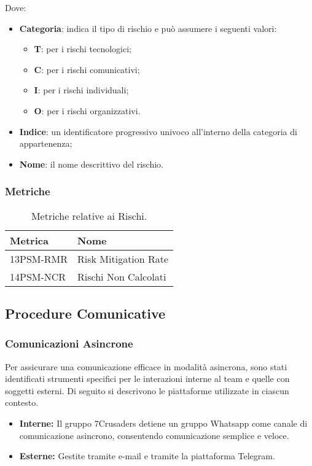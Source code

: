 Dove:
\begin{itemize}
    \item \textbf{Categoria}: indica il tipo di rischio e può assumere i seguenti valori:
    \begin{itemize}
        \item \textbf{T}: per i rischi tecnologici;
        \item \textbf{C}: per i rischi comunicativi;
        \item \textbf{I}: per i rischi individuali;
        \item \textbf{O}: per i rischi organizzativi.
    \end{itemize}
    \item \textbf{Indice}: un identificatore progressivo univoco all'interno della categoria di appartenenza;
    \item \textbf{Nome}: il nome descrittivo del rischio.
\end{itemize}

\subsubsection{Metriche}
\begin{table}[h!]
    \centering
    \renewcommand{\arraystretch}{1.5}
    \begin{tabular}{|l|l|}
        \hline
        \textbf{Metrica} & \textbf{Nome} \\
        \hline
        13PSM-RMR & Risk Mitigation Rate \\
        \hline
        14PSM-NCR & Rischi Non Calcolati \\
        \hline
    \end{tabular}
    \caption{Metriche relative ai Rischi.}
\end{table}



\subsection{Procedure Comunicative}

\subsubsection{Comunicazioni Asincrone}
Per assicurare una comunicazione efficace in modalità asincrona, sono stati identificati strumenti specifici per le interazioni interne al team e quelle con soggetti esterni. Di seguito si descrivono le piattaforme utilizzate in ciascun contesto.
\begin{itemize}
    \item \textbf{Interne:} Il gruppo 7Crusaders detiene un gruppo Whatsapp come canale di comunicazione asincrono, consentendo comunicazione semplice e veloce.
    \item \textbf{Esterne:} Gestite tramite e-mail e tramite la piattaforma Telegram.
\end{itemize}

